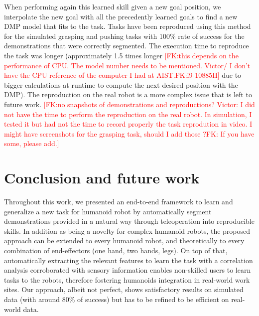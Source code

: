 \documentclass[conference]{IEEEtran}
\newcommand{\fk}[1]{\textcolor{red}{[FK:#1]}}
\begin{document}
When performing again this learned skill given a new goal position, we interpolate the new goal with all the precedently learned goals to find a new DMP model that fits to the task. Tasks have been reproduced using this method for the simulated grasping and pushing tasks with 100\% rate of success for the demonstrations that were correctly segmented. The execution time to reproduce the task was longer (approximately 1.5 times longer \fk{this depends on the performance of CPU. The model number needs to be mentioned. \newline
Victor/ I don't have the CPU reference of the computer I had at AIST.\newline FK:i9-10885H} due to bigger calculations at runtime to compute the next desired position with the DMP). The reproduction on the real robot is a more complex issue that is left to future work. 
\fk{no snapshots of demonstrations and reproductions? \newline
Victor: I did not have the time to perform the reproduction on the real robot. In simulation, I tested it but had not the time to record properly the task reprodution in video. I might have screenshots for the grasping task, should I add those ?\newline FK: If you have some, please add.}

\section{Conclusion and future work}\label{conclusion}

Throughout this work, we presented an end-to-end framework to learn and generalize a new task for humanoid robot by automatically segment demonstrations provided in a natural way through teleoperation into reproducible skills. In addition as being a novelty for complex humanoid robots, the proposed approach can be extended to every humanoid robot, and theoretically to every combination of end-effectors (one hand, two hands, legs). On top of that, automatically extracting the relevant features to learn the task with a correlation analysis corroborated with sensory information enables non-skilled users to learn tasks to the robots, therefore fostering humanoids integration in real-world work sites. Our approach, albeit not perfect, shows satisfactory results on simulated data (with around 80\% of success) but has to be refined to be efficient on real-world data. \newline
\end{document}
